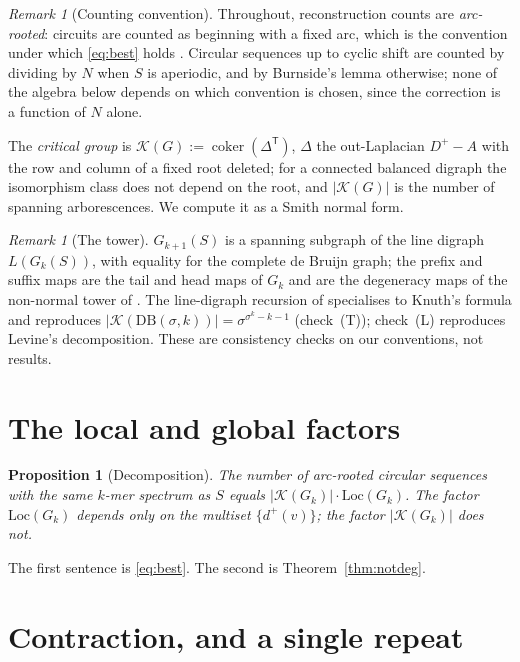 \documentclass[11pt]{article}
\theoremstyle{plain}
\newtheorem{proposition}[theorem]{Proposition}
\theoremstyle{definition}
\theoremstyle{remark}
\newtheorem{remark}[theorem]{Remark}
\newcommand{\K}{\mathcal{K}}
\newcommand{\Loc}{\mathrm{Loc}}
\newcommand{\coker}{\operatorname{coker}}
\newcommand{\DB}{\mathrm{DB}}
\begin{document}
\begin{remark}[Counting convention]\label{rem:convention}
Throughout, reconstruction counts are \emph{arc-rooted}: circuits are counted as beginning
with a fixed arc, which is the convention under which \eqref{eq:best} holds
\cite{AEdB,SmithTutte}. Circular sequences up to cyclic shift are counted by dividing by
$N$ when $S$ is aperiodic, and by Burnside's lemma otherwise; none of the algebra below
depends on which convention is chosen, since the correction is a function of $N$ alone.
\end{remark}

The \emph{critical group} is $\K(G):=\coker(\Delta^{\mathsf T})$, $\Delta$ the out-Laplacian
$D^{+}-A$ with the row and column of a fixed root deleted; for a connected balanced digraph
the isomorphism class does not depend on the root, and $|\K(G)|$ is the number of spanning
arborescences. We compute it as a Smith normal form.

\begin{remark}[The tower]\label{rem:tower}
$G_{k+1}(S)$ is a spanning subgraph of the line digraph $L(G_k(S))$, with equality for the
complete de Bruijn graph; the prefix and suffix maps are the tail and head maps of $G_k$
and are the degeneracy maps of the non-normal tower of \cite[V]{ANCFT}. The line-digraph
recursion of \cite[III]{ANCFT} specialises to Knuth's formula and reproduces
$|\K(\DB(\sigma,k))|=\sigma^{\sigma^{k}-k-1}$ (check~(T)); check~(L) reproduces Levine's
decomposition. These are consistency checks on our conventions, not results.
\end{remark}

\section{The local and global factors}\label{sec:decomp}

\begin{proposition}[Decomposition]\label{prop:decomp}
The number of arc-rooted circular sequences with the same $k$-mer spectrum as $S$ equals
$|\K(G_k)|\cdot\Loc(G_k)$. The factor $\Loc(G_k)$ depends only on the multiset
$\{d^{+}(v)\}$; the factor $|\K(G_k)|$ does not.
\end{proposition}

The first sentence is \eqref{eq:best}. The second is Theorem~\ref{thm:notdeg}.

\section{Contraction, and a single repeat}\label{sec:repeat}
\end{document}
